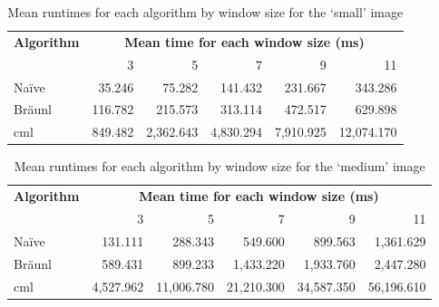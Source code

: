 \begin{table}
\centering
\caption[Mean runtimes for each algorithm for the `small' image]{Mean runtimes for each algorithm by window size for the `small' image}
\label{tab:median:small}
\begin{tabular}{@{}lrrrrr@{}}
\toprule
\multicolumn{1}{c}{\textbf{Algorithm}} & \multicolumn{5}{c}{\textbf{Mean time for each window size (ms)}}  \\
                              & 3       & 5         & 7         & 9         & 11         \\ \midrule
Naïve                         & 35.246  & 75.282    & 141.432   & 231.667   & 343.286    \\
Bräunl                        & 116.782 & 215.573   & 313.114   & 472.517   & 629.898    \\
\gls{cml}                           & 849.482 & 2,362.643 & 4,830.294 & 7,910.925 & 12,074.170 \\ \bottomrule
\end{tabular}
\end{table}

\begin{table}
\centering
\caption[Mean runtimes for each algorithm for the `medium' image]{Mean runtimes for each algorithm by window size for the `medium' image}
\label{tab:median:medium}
\begin{tabular}{@{}lrrrrr@{}}
\toprule
\multicolumn{1}{c}{\textbf{Algorithm}} & \multicolumn{5}{c}{\textbf{Mean time for each window size (ms)}}      \\
\multicolumn{1}{r}{}                   & \multicolumn{1}{r}{3} & 5         & 7         & 9         & 11        \\ \midrule
Naïve                                  & 131.111               & 288.343   & 549.600   & 899.563   & 1,361.629 \\
Bräunl                                 & 589.431
               & 899.233   & 1,433.220  & 1,933.760  & 2,447.280  \\
\gls{cml}                                    & 4,527.962
               & 11,006.780 & 21,210.300 & 34,587.350 & 56,196.610 \\ \bottomrule
\end{tabular}
\end{table}

